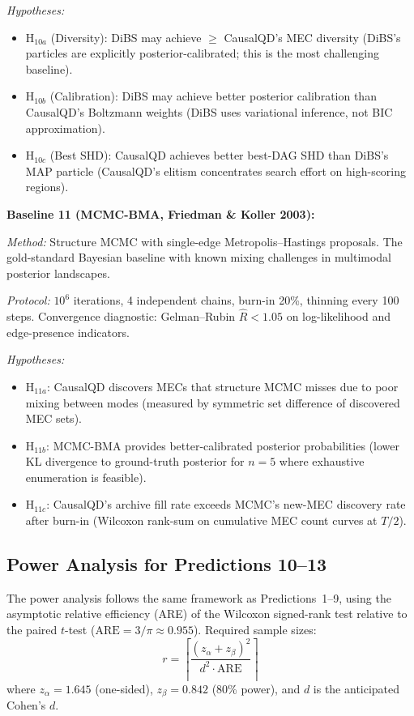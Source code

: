 \documentclass{article}
\theoremstyle{definition}
\theoremstyle{plain}
\theoremstyle{remark}
\begin{document}
\emph{Hypotheses:}
\begin{itemize}
  \item H$_{10a}$ (Diversity): DiBS may achieve $\geq$ CausalQD's MEC
    diversity (DiBS's particles are explicitly posterior-calibrated; this
    is the most challenging baseline).
  \item H$_{10b}$ (Calibration): DiBS may achieve better posterior
    calibration than CausalQD's Boltzmann weights (DiBS uses variational
    inference, not BIC approximation).
  \item H$_{10c}$ (Best SHD): CausalQD achieves better best-DAG SHD
    than DiBS's MAP particle (CausalQD's elitism concentrates search
    effort on high-scoring regions).
\end{itemize}

\textbf{Baseline 11 (MCMC-BMA, Friedman \& Koller 2003):}

\emph{Method:} Structure MCMC with single-edge Metropolis--Hastings
proposals. The gold-standard Bayesian baseline with known mixing
challenges in multimodal posterior landscapes.

\emph{Protocol:} $10^6$ iterations, 4 independent chains, burn-in 20\%,
thinning every 100 steps. Convergence diagnostic: Gelman--Rubin
$\hat{R} < 1.05$ on log-likelihood and edge-presence indicators.

\emph{Hypotheses:}
\begin{itemize}
  \item H$_{11a}$: CausalQD discovers MECs that structure MCMC misses due
    to poor mixing between modes (measured by symmetric set difference of
    discovered MEC sets).
  \item H$_{11b}$: MCMC-BMA provides better-calibrated posterior
    probabilities (lower KL divergence to ground-truth posterior for
    $n = 5$ where exhaustive enumeration is feasible).
  \item H$_{11c}$: CausalQD's archive fill rate exceeds MCMC's new-MEC
    discovery rate after burn-in (Wilcoxon rank-sum on cumulative MEC
    count curves at $T/2$).
\end{itemize}


\subsection*{Power Analysis for Predictions 10--13}

The power analysis follows the same framework as Predictions~1--9,
using the asymptotic relative efficiency (ARE) of the Wilcoxon
signed-rank test relative to the paired $t$-test
($\mathrm{ARE} = 3/\pi \approx 0.955$). Required sample sizes:
\begin{equation}
  r = \left\lceil \frac{(z_\alpha + z_\beta)^2}{d^2 \cdot \mathrm{ARE}}
  \right\rceil
\end{equation}
where $z_\alpha = 1.645$ (one-sided), $z_\beta = 0.842$ (80\% power),
and $d$ is the anticipated Cohen's $d$.
\end{document}

